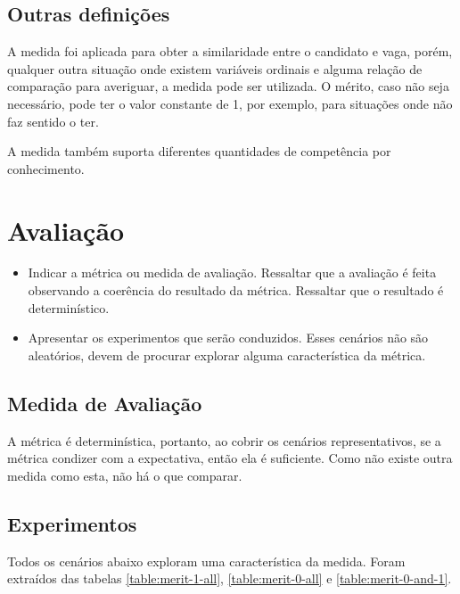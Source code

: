 \documentclass[preprint,12pt]{elsarticle}
\begin{document}
\subsection{Outras definições}

A medida foi aplicada para obter a similaridade entre o candidato e vaga, porém, qualquer outra situação onde existem variáveis ordinais e alguma relação de comparação para averiguar, a medida pode ser utilizada. O mérito, caso não seja necessário, pode ter o valor constante de 1, por exemplo, para situações onde não faz sentido o ter.

A medida também suporta diferentes quantidades de competência por conhecimento.

\section{Avaliação}
\label{sec:sample4}
\begin{itemize}
\color{blue}
\item Indicar a métrica ou medida de avaliação. Ressaltar que a avaliação é feita observando a coerência do resultado da métrica. Ressaltar que o resultado é determinístico. 
\item Apresentar os experimentos que serão conduzidos. Esses cenários não são aleatórios, devem de procurar explorar alguma característica da métrica.
\end{itemize}

\subsection{Medida de Avaliação}
A métrica é determinística, portanto, ao cobrir os cenários representativos, se a métrica condizer com a expectativa, então ela é suficiente. Como não existe outra medida como esta, não há o que comparar.

\subsection{Experimentos}

Todos os cenários abaixo exploram uma característica da medida. Foram extraídos das tabelas \ref{table:merit-1-all}, \ref{table:merit-0-all} e \ref{table:merit-0-and-1}.
\end{document}
